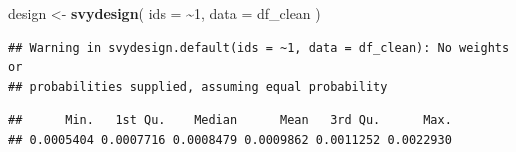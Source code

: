 \documentclass[
]{article}
\newenvironment{Shaded}{\begin{snugshade}}{\end{snugshade}}
\newcommand{\AttributeTok}[1]{\textcolor[rgb]{0.13,0.29,0.53}{#1}}
\newcommand{\DecValTok}[1]{\textcolor[rgb]{0.00,0.00,0.81}{#1}}
\newcommand{\FunctionTok}[1]{\textcolor[rgb]{0.13,0.29,0.53}{\textbf{#1}}}
\newcommand{\NormalTok}[1]{#1}
\newcommand{\OtherTok}[1]{\textcolor[rgb]{0.56,0.35,0.01}{#1}}
\newcommand{\SpecialCharTok}[1]{\textcolor[rgb]{0.81,0.36,0.00}{\textbf{#1}}}
\newcommand{\StringTok}[1]{\textcolor[rgb]{0.31,0.60,0.02}{#1}}
\begin{document}
\begin{Shaded}
\begin{Highlighting}[]
\NormalTok{design }\OtherTok{\textless{}{-}} \FunctionTok{svydesign}\NormalTok{(}
  \AttributeTok{ids =} \SpecialCharTok{\textasciitilde{}}\DecValTok{1}\NormalTok{,}
  \AttributeTok{data =}\NormalTok{ df\_clean}
\NormalTok{)}
\end{Highlighting}
\end{Shaded}

\begin{verbatim}
## Warning in svydesign.default(ids = ~1, data = df_clean): No weights or
## probabilities supplied, assuming equal probability
\end{verbatim}

\begin{Shaded}
\end{Shaded}

\begin{verbatim}
##      Min.   1st Qu.    Median      Mean   3rd Qu.      Max. 
## 0.0005404 0.0007716 0.0008479 0.0009862 0.0011252 0.0022930
\end{verbatim}

\begin{Shaded}
\end{Shaded}
\end{document}
